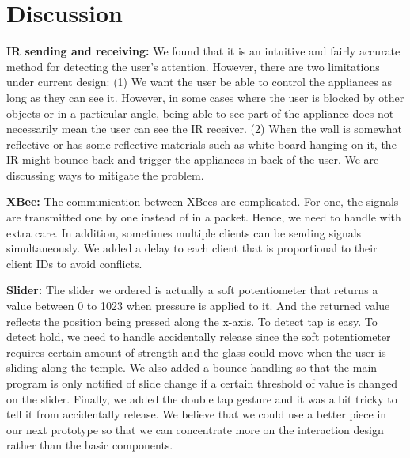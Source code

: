 
\section{Discussion}
\label{sec:discussion}


\textbf{IR sending and receiving:} We found that it is an intuitive and fairly accurate method for detecting the user's attention. However, there are two limitations under current design: (1) We want the user be able to control the appliances as long as they can see it. However, in some cases where the user is blocked by other objects or in a particular angle, being able to see part of the appliance does not necessarily mean the user can see the IR receiver. (2) When the wall is somewhat reflective or has some reflective materials such as white board hanging on it, the IR might bounce back and trigger the appliances in back of the user. We are discussing ways to mitigate the problem.

\textbf{XBee:} The communication between XBees are complicated. For one, the signals are transmitted one by one instead of in a packet. Hence, we need to handle with extra care. In addition, sometimes multiple clients can be sending signals simultaneously. We added a delay to each client that is proportional to their client IDs to avoid conflicts.

\textbf{Slider:} The slider we ordered is actually a soft potentiometer that returns a value between 0 to 1023 when pressure is applied to it. And the returned value reflects the position being pressed along the x-axis. To detect tap is easy. To detect hold, we need to handle accidentally release since the soft potentiometer requires certain amount of strength and the glass could move when the user is sliding along the temple. We also added a bounce handling so that the main program is only notified of slide change if a certain threshold of value is changed on the slider. Finally, we added the double tap gesture and it was a bit tricky to tell it from accidentally release. We believe that we could use a better piece
in our next prototype so that we can concentrate more on the interaction design rather than the basic components.

